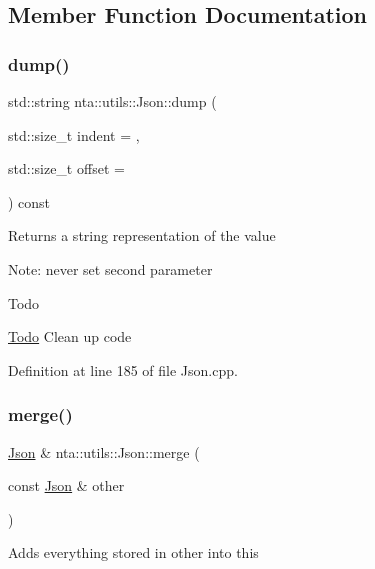 \subsection{Member Function Documentation}
\mbox{\label{classnta_1_1utils_1_1Json_ab0e60f7a55d12aab005d420c8f924035}} 
\subsubsection{\texorpdfstring{dump()}{dump()}}
{\footnotesize\ttfamily std\+::string nta\+::utils\+::\+Json\+::dump (\begin{DoxyParamCaption}\item[{std\+::size\+\_\+t}]{indent = {},  }\item[{std\+::size\+\_\+t}]{offset = {} }\end{DoxyParamCaption}) const}

Returns a string representation of the value

Note\+: never set second parameter

\begin{DoxyRefDesc}{Todo}
\item[\hyperlink{todo__todo000025}{Todo}]Clean up code \end{DoxyRefDesc}


Definition at line 185 of file Json.\+cpp.

\mbox{\label{classnta_1_1utils_1_1Json_ac33a8a65bdfaff7c365f99c9ca71eeab}} 
\subsubsection{\texorpdfstring{merge()}{merge()}}
{\footnotesize\ttfamily \hyperlink{classnta_1_1utils_1_1Json}{Json} \& nta\+::utils\+::\+Json\+::merge (\begin{DoxyParamCaption}\item[{const \hyperlink{classnta_1_1utils_1_1Json}{Json} \&}]{other }\end{DoxyParamCaption})}

Adds everything stored in other into this

